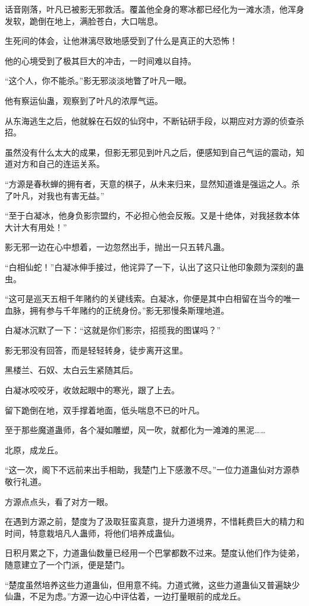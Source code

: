\begin{this_body}
话音刚落，叶凡已被影无邪救活。覆盖他全身的寒冰都已经化为一滩水渍，他浑身发软，跪倒在地上，满脸苍白，大口喘息。

生死间的体会，让他淋漓尽致地感受到了什么是真正的大恐怖！

他的心境受到了极其巨大的冲击，一时间难以自持。

“这个人，你不能杀。”影无邪淡淡地瞥了叶凡一眼。

他有察运仙蛊，观察到了叶凡的浓厚气运。

从东海逃生之后，他就躲在石奴的仙窍中，不断钻研手段，以期应对方源的侦查杀招。

虽然没有什么太大的成果，但影无邪见到叶凡之后，便感知到自己气运的震动，知道对方和自己的连运关系。

“方源是春秋蝉的拥有者，天意的棋子，从未来归来，显然知道谁是强运之人。杀了叶凡，对我也有害无益。”

“至于白凝冰，他身负影宗盟约，不必担心他会反叛。又是十绝体，对我拯救本体大计大有用处！”

影无邪一边在心中想着，一边忽然出手，抛出一只五转凡蛊。

“白相仙蛇！”白凝冰伸手接过，他诧异了一下，认出了这只让他印象颇为深刻的蛊虫。

“这可是巡天五相千年赌约的关键线索。白凝冰，你便是其中白相留在当今的唯一血脉，拥有参与千年赌约的正统身份。”影无邪慢条斯理地道。

白凝冰沉默了一下：“这就是你们影宗，招揽我的图谋吗？”

影无邪没有回答，而是轻轻转身，徒步离开这里。

黑楼兰、石奴、太白云生紧随其后。

白凝冰咬咬牙，收敛起眼中的寒光，跟了上去。

留下跪倒在地，双手撑着地面，低头喘息不已的叶凡。

至于那些魔道蛊师，各个凝如雕塑，风一吹，就都化为一滩滩的黑泥……

北原，成龙丘。

“这一次，阁下不远前来出手相助，我楚门上下感激不尽。”一位力道蛊仙对方源恭敬行礼道。

方源点点头，看了对方一眼。

在遇到方源之前，楚度为了汲取狂蛮真意，提升力道境界，不惜耗费巨大的精力和时间，特意栽培凡人蛊师，将他们培养成蛊仙。

日积月累之下，力道蛊仙数量已经用一个巴掌都数不过来。楚度认他们作为徒弟，随意建立了一个门派，便是楚门。

“楚度虽然培养这些力道蛊仙，但用意不纯。力道式微，这些力道蛊仙又普遍缺少仙蛊，不足为虑。”方源一边心中评估着，一边打量眼前的成龙丘。


\end{this_body}
